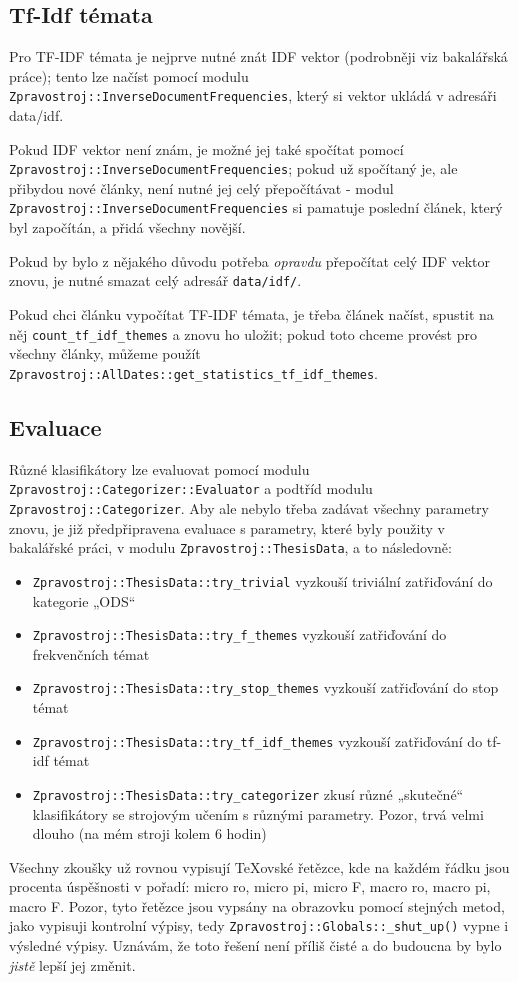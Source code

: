 \documentclass[12pt,a4paper]{report}
\def\uv#1{„#1“}
\begin{document}
\subsection{Tf-Idf témata}

Pro TF-IDF témata je nejprve nutné znát IDF vektor (podrobněji viz bakalářská práce); tento lze načíst pomocí modulu \texttt{Zpravostroj::InverseDocumentFrequencies}, který si vektor ukládá v adresáři data/idf.

Pokud IDF vektor není znám, je možné jej také spočítat pomocí \texttt{Zpravostroj::InverseDocumentFrequencies}; pokud už spočítaný je, ale přibydou nové články, není nutné jej celý přepočítávat - modul \texttt{Zpravostroj::InverseDocumentFrequencies} si pamatuje poslední článek, který byl započítán, a přidá všechny novější.

Pokud by bylo z nějakého důvodu potřeba \emph{opravdu} přepočítat celý IDF vektor znovu, je nutné smazat celý adresář \texttt{data/idf/}.

Pokud chci článku vypočítat TF-IDF témata, je třeba článek načíst, spustit na něj \texttt{count\_tf\_idf\_themes} a znovu ho uložit; pokud toto chceme provést pro všechny články, můžeme použít \texttt{Zpravostroj::AllDates::get\_statistics\_tf\_idf\_themes}.


\subsection{Evaluace}

Různé klasifikátory lze evaluovat pomocí modulu \texttt{Zpravostroj::Categorizer::Evaluator} a podtříd modulu \texttt{Zpravostroj::Categorizer}. Aby ale nebylo třeba zadávat všechny parametry znovu, je již předpřipravena evaluace s parametry, které byly použity v bakalářské práci, v modulu \texttt{Zpravostroj::ThesisData}, a to následovně:

\begin{itemize}
	\item \texttt{Zpravostroj::ThesisData::try\_trivial} vyzkouší triviální zatřiďování do kategorie \uv{ODS}
	\item \texttt{Zpravostroj::ThesisData::try\_f\_themes} vyzkouší zatřiďování do frekvenčních témat
	\item \texttt{Zpravostroj::ThesisData::try\_stop\_themes} vyzkouší zatřiďování do stop témat
	\item \texttt{Zpravostroj::ThesisData::try\_tf\_idf\_themes} vyzkouší zatřiďování do tf-idf témat
	\item \texttt{Zpravostroj::ThesisData::try\_categorizer} zkusí různé \uv{skutečné} klasifikátory se strojovým učením s různými parametry. Pozor, trvá velmi dlouho (na mém stroji kolem 6 hodin)
\end{itemize}
Všechny zkoušky už rovnou vypisují TeXovské řetězce, kde na každém řádku jsou procenta úspěšnosti v pořadí: micro ro, micro pi, micro F, macro ro, macro pi, macro F. Pozor, tyto řetězce jsou vypsány na obrazovku pomocí stejných metod, jako vypisuji kontrolní výpisy, tedy \texttt{Zpravostroj::Globals::\_shut\_up()} vypne i výsledné výpisy. Uznávám, že toto řešení není příliš čisté a do budoucna by bylo \emph{jistě} lepší jej změnit.
\end{document}
